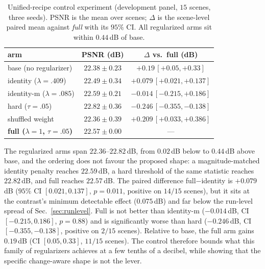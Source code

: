 \begin{table}[t]
\centering
\footnotesize
\caption{Unified-recipe control experiment (development panel, $15$ scenes,
three seeds). PSNR is the mean over scenes; $\Delta$ is the scene-level paired
mean against \emph{full} with its $95\%$ CI. All regularized arms sit within
$0.44$\,dB of base.}
\label{tab:control}
\begin{tabular}{lcc}
\toprule
arm & PSNR (dB) & $\Delta$ vs.\ full (dB) \\
\midrule
base (no regularizer)        & $22.38\pm0.23$ & $+0.19\,[+0.05,+0.33]$ \\
identity ($\lambda{=}.409$)  & $22.49\pm0.34$ & $+0.079\,[+0.021,+0.137]$ \\
identity-m ($\lambda{=}.085$) & $22.59\pm0.21$ & $-0.014\,[-0.215,+0.186]$ \\
hard ($\tau{=}.05$)          & $22.82\pm0.36$ & $-0.246\,[-0.355,-0.138]$ \\
shuffled weight              & $22.36\pm0.39$ & $+0.209\,[+0.033,+0.386]$ \\
\textbf{full ($\lambda{=}1$, $\tau{=}.05$)} & $\mathbf{22.57\pm0.00}$ & --- \\
\bottomrule
\end{tabular}
\end{table}

The regularized arms span $22.36$--$22.82$\,dB, from $0.02$\,dB below to
$0.44$\,dB above base, and the ordering does not favour the proposed shape: a
magnitude-matched identity penalty reaches $22.59$\,dB, a hard threshold of the
same statistic reaches $22.82$\,dB, and full reaches $22.57$\,dB. The paired
difference full$-$identity is $+0.079$\,dB ($95\%$ CI $[0.021,0.137]$,
$p=0.011$, positive on $14/15$ scenes), but it sits at the contrast's minimum
detectable effect ($0.075$\,dB) and far below the run-level spread of
Sec.~\ref{sec:runlevel}. Full is not better than identity-m
($-0.014$\,dB, CI $[-0.215,0.186]$, $p=0.88$) and is significantly worse than
hard ($-0.246$\,dB, CI $[-0.355,-0.138]$, positive on $2/15$ scenes). Relative
to base, the full arm gains $0.19$\,dB (CI $[0.05,0.33]$, $11/15$ scenes).
The control therefore bounds what this family of regularizers achieves at a
few tenths of a decibel, while showing that the specific change-aware shape is
not the lever.

